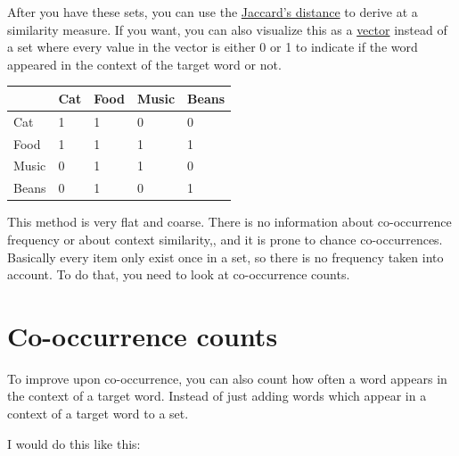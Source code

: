 \documentclass[
  11pt,
  british,
]{article}
\begin{document}
After you have these sets, you can use the
\href{Jaccard's\%20distance.md}{Jaccard's distance} to derive at a
similarity measure. If you want, you can also visualize this as a
\href{Vector\%20semantics.md}{vector} instead of a set where every value
in the vector is either 0 or 1 to indicate if the word appeared in the
context of the target word or not.

\begin{longtable}[]{@{}lllll@{}}
\toprule
& Cat & Food & Music & Beans \\
\midrule
\endhead
Cat & 1 & 1 & 0 & 0 \\
Food & 1 & 1 & 1 & 1 \\
Music & 0 & 1 & 1 & 0 \\
Beans & 0 & 1 & 0 & 1 \\
\bottomrule
\end{longtable}

This method is very flat and coarse. There is no information about
co-occurrence frequency or about context similarity,, and it is prone to
chance co-occurrences. Basically every item only exist once in a set, so
there is no frequency taken into account. To do that, you need to look
at co-occurrence counts.

\hypertarget{co-occurrence-counts}{%
\section{Co-occurrence counts}\label{co-occurrence-counts}}

To improve upon co-occurrence, you can also count how often a word
appears in the context of a target word. Instead of just adding words
which appear in a context of a target word to a set.

I would do this like this:
\end{document}
